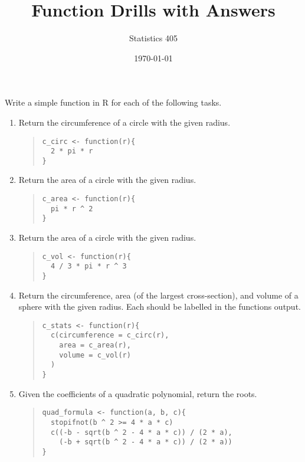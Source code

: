 \documentclass{article}
\begin{document}
\title{Function Drills with Answers}
\author{Statistics 405}
\date{\today}
\maketitle


\noindent Write a simple function in R for each of the following tasks. 
\begin{enumerate}

\item Return the circumference of a circle with the given radius.
  \begin{quote}
    \begin{verbatim}
c_circ <- function(r){
  2 * pi * r
}    
    \end{verbatim}
  \end{quote}

\item Return the area of a circle with the given radius.
  \begin{quote}
    \begin{verbatim}
c_area <- function(r){
  pi * r ^ 2
}
    \end{verbatim}
  \end{quote}
  
  \item Return the area of a circle with the given radius.
  \begin{quote}
    \begin{verbatim}
c_vol <- function(r){
  4 / 3 * pi * r ^ 3
}	    
    \end{verbatim}
  \end{quote}
  
\item Return the circumference, area (of the largest cross-section), and volume of a sphere with the given radius. Each should be labelled in the functions output.
  \begin{quote}
    \begin{verbatim}
c_stats <- function(r){
  c(circumference = c_circ(r),
    area = c_area(r),
    volume = c_vol(r)
  )
}    
    \end{verbatim}
  \end{quote}

\item Given the coefficients of a quadratic polynomial, return the roots.
  \begin{quote}
    \begin{verbatim}
quad_formula <- function(a, b, c){
  stopifnot(b ^ 2 >= 4 * a * c)
  c((-b - sqrt(b ^ 2 - 4 * a * c)) / (2 * a),
    (-b + sqrt(b ^ 2 - 4 * a * c)) / (2 * a))
}    
    \end{verbatim}
  \end{quote}


\end{enumerate}
\end{document}
